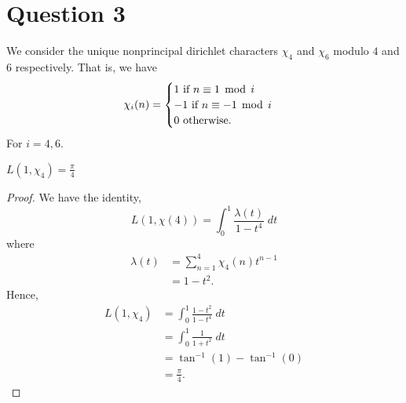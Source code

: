 \documentclass{unswmaths}
\begin{document}
    \section*{Question 3}
    We consider the unique nonprincipal  dirichlet characters $\chi_4$ and $\chi_6$ modulo $4$ and $6$ respectively. That is, we have
    \begin{equation*}
        \chi_i(n) = \begin{cases}
            1\text{ if }n \equiv 1 \;\operatorname{mod}\;i\\
            -1\text{ if }n \equiv -1 \;\operatorname{mod}\;i\\
            0\text{ otherwise.}
        \end{cases}
    \end{equation*}
    For $i = 4,6$.
    \begin{theorem}
        $L(1,\chi_4) = \frac{\pi}{4}$
    \end{theorem}
    \begin{proof}
        We have the identity,
        \begin{equation*}
            L(1,\chi(4)) = \int_0^1 \frac{\lambda(t)}{1-t^4}\;dt
        \end{equation*}
        where
        \begin{align*}
            \lambda(t) &= \sum_{n=1}^4 \chi_4(n)t^{n-1}\\
            &= 1-t^2.
        \end{align*}
        Hence,
        \begin{align*}
            L(1,\chi_4) &= \int_0^1 \frac{1-t^2}{1-t^4}\;dt\\
            &= \int_0^1 \frac{1}{1+t^2}\;dt\\
            &= \tan^{-1}(1)-\tan^{-1}(0)\\
            &= \frac{\pi}{4}.
        \end{align*}        
    \end{proof}
    
\end{document}
